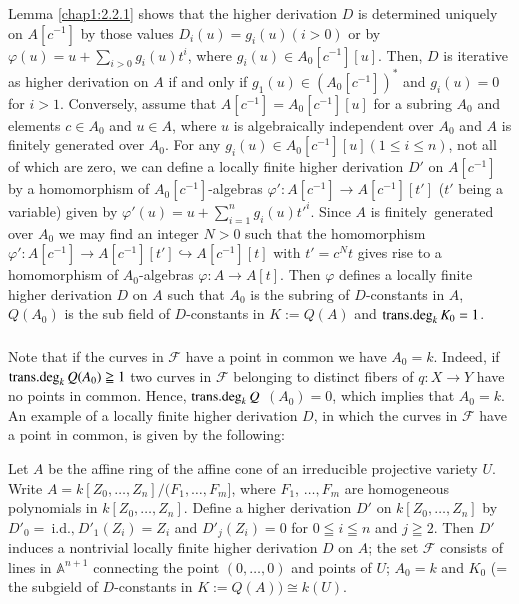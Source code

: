 \subsubsection{}\label{chap1:2.2.2}
Lemma \ref{chap1:2.2.1} shows that the higher derivation $D$ is
determined uniquely on $A[c^{-1}]$ by those values
$D_{i}(u)=g_{i}(u)(i>0)$ or by
$\varphi(u)=u+\sum\limits_{i>0}g_{i}(u)t^{i}$, where $g_{i}(u)\in
A_{0}[c^{-1}][u]$. Then, $D$ is iterative as higher derivation on $A$
if and only if $g_{1}(u)\in (A_{0}[c^{-1}])^{\ast}$ and $g_{i}(u)=0$
for $i>1$. Conversely, assume that $A[c^{-1}]=A_{0}[c^{-1}][u]$ for a
subring $A_{0}$ and elements $c\in A_{0}$ and $u\in A$, where $u$ is
algebraically independent over $A_{0}$ and $A$ is finitely generated
over $A_{0}$. For any $g_{i}(u)\in A_{0}[c^{-1}][u](1\leq i\leq n)$,
not all of which are zero, we can define a locally finite higher
derivation $D'$ on $A[c^{-1}]$ by a homomorphism of
$A_{0}[c^{-1}]$-algebras $\varphi':A[c^{-1}]\to A[c^{-1}][t']$ ($t'$
being a variable) given by
$\varphi'(u)=u+\sum\limits^{n}_{i=1}g_{i}(u){t'}^{i}$. Since $A$ is
finitely\pageoriginale\ generated over $A_{0}$ we may find an integer
$N>0$ such that the homomorphism $\varphi':A[c^{-1}]\to
A[c^{-1}][t']\hookrightarrow A[c^{-1}][t]$ with $t'=c^{N}t$ gives rise
to a homomorphism of $A_{0}$-algebras $\varphi:A\to A[t]$. Then
$\varphi$ defines a locally finite higher derivation $D$ on $A$ such
that $A_{0}$ is the subring of $D$-constants in $A$, $Q(A_{0})$ is the
sub field of $D$-constants in $K:=Q(A)$ and $\operatorname{trans{.}deg}_{k}K_{0}=1$.

\subsubsection{}\label{chap1:2.2.3}
Note that if the curves in $\mathscr{F}$ have a point in common we
have $A_{0}=k$. Indeed, if $\operatorname{trans{.}deg}_{k}Q(A_{0})\geqq 1$ two curves
in $\mathscr{F}$ belonging to distinct fibers of $q:X\to Y$ have no
points in common. Hence, $\operatorname{trans{.}deg}_{k}Q$ $(A_{0})=0$, which implies that
$A_{0}=k$. An example of a locally finite higher derivation $D$, in
which the curves in $\mathscr{F}$ have a point in common, is given by
the following:

\begin{example*}
Let $A$ be the affine ring of the affine cone of an irreducible
projective variety $U$. Write
$A=k[Z_{0},\ldots,Z_{n}]/(F_{1},\ldots,F_{m}]$, where
  $F_{1}$, $\ldots,F_{m}$ are homogeneous polynomials in $k[Z_{0},
    \ldots,Z_{n}]$. Define a higher derivation $D'$ on
  $k[Z_{0},\ldots,Z_{n}]$ by $D'_{0}=~\text{i.d.,}~ D'_{1}(Z_{i})=Z_{i}$ and
  $D'_{j}(Z_{i})=0$ for $0\leqq i\leqq n$ and $j\geqq 2$. Then $D'$
  induces a nontrivial locally finite higher derivation $D$ on $A$;
  the set $\mathscr{F}$ consists of lines in $\mathbb{A}^{n+1}$
  connecting the point $(0,\ldots,0)$ and points of $U$; $A_{0}=k$ and
  $K_{0}$ (= the subgield of $D$-constants in $K:=Q(A)) \cong k(U)$.
\end{example*}

